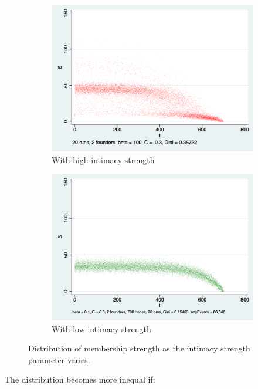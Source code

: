 \documentclass{article}
\begin{document}
\begin{figure}
  \begin{subfigure}[b]{0.5\textwidth}
    \includegraphics[width=\textwidth]{HighIntimacy2.png}
    \caption{With high intimacy strength}
    \label{highIntimacy}
  \end{subfigure}
  \begin{subfigure}[b]{0.5\textwidth}
    \includegraphics[width=\textwidth]{LowIntimacy.png}
    \caption{With low intimacy strength}
    \label{lowIntimacy}
  \end{subfigure}
  \caption{Distribution of membership strength as the intimacy strength parameter varies.}
\end{figure}

The distribution becomes more inequal if:
\end{document}
